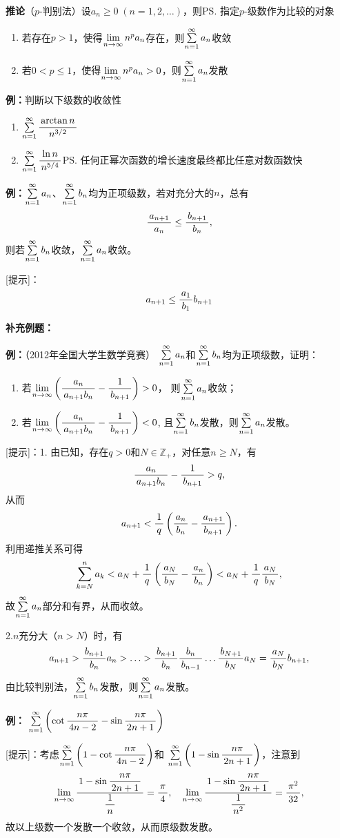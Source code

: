 {\bf 推论}（$p$-判别法）设$a_n\geq 0\;(n=1,2,\ldots)$，则\ps{指定$p$-级数作为比较的对象} 
\begin{enumerate}
  \setlength{\itemindent}{1cm}
  \item 若存在$p>1$，使得$\limn n^pa_n$存在，则$\sumn a_n$收敛 
  \item 若$0<p\leq 1$，使得$\limn n^pa_n>0$，则$\sumn a_n$发散
\end{enumerate}

{\bf 例：}判断以下级数的收敛性
\begin{enumerate}[(1)]
  \setlength{\itemindent}{1cm}
  \item $\sumn\df{\arctan n}{n^{3/2}}$
  \item $\sumn\df{\ln n}{n^{5/4}}$\ps{任何正幂次函数的增长速度最终都比任意对数函数快}
\end{enumerate}

{\bf 例：}$\sumn a_n$、$\sumn b_n$均为正项级数，若对充分大的$n$，总有
$$\df{a_{n+1}}{a_n}\leq\df{b_{n+1}}{b_n},$$
则若$\sumn b_n$收敛，$\sumn a_n$收敛。

[提示]：
$$a_{n+1}\leq\df{a_1}{b_1}b_{n+1}$$

{\bf 补充例题：}

{\bf 例：}（2012年全国大学生数学竞赛）
$\sumn a_n$和$\sumn b_n$均为正项级数，证明：
\begin{enumerate}
  \setlength{\itemindent}{1cm}
  \item 若$\limn\left(\df{a_n}{a_{n+1}b_n}-\df 1{b_{n+1}}\right)>0$，
  则$\sumn a_n$收敛；
  \item 若$\limn\left(\df{a_n}{a_{n+1}b_n}-\df 1{b_{n+1}}\right)<0$,
  且$\sumn b_n$发散，则$\sumn a_n$发散。
\end{enumerate}

[提示]：1. 由已知，存在$q>0$和$N\in\mathbb{Z}_+$，对任意$n\geq N$，有
$$\df{a_n}{a_{n+1}b_n}-\df 1{b_{n+1}}>q,$$
从而
$$a_{n+1}<\df1q\left(\df{a_n}{b_n}-\df{a_{n+1}}{b_{n+1}}\right).$$
利用递推关系可得
$$\sum\limits_{k=N}^na_k<a_N+\df1q\left(\df{a_N}{b_N}-\df{a_n}{b_n}\right)
<a_N+\df1q\df{a_N}{b_N},$$
故$\sumn a_n$部分和有界，从而收敛。

2.$n$充分大（$n>N$）时，有
$$a_{n+1}>\df{b_{n+1}}{b_n}a_n>\ldots>
\df{b_{n+1}}{b_n}\df{b_{n}}{b_{n-1}}\ldots\df{b_{N+1}}{b_N}a_N
=\df{a_N}{b_N}b_{n+1},$$
由比较判别法，$\sumn b_n$发散，则$\sumn a_n$发散。

{\bf 例：} $\sumn\left(\cot\df{n\pi}{4n-2}-\sin\df{n\pi}{2n+1}\right)$

[提示]：考虑$\sumn\left(1-\cot\df{n\pi}{4n-2}\right)$和
$\sumn\left(1-\sin\df{n\pi}{2n+1}\right)$，注意到
$$\limn\df{1-\sin\df{n\pi}{2n+1}}{\df1n}=\df{\pi}4,
\quad\limn\df{1-\sin\df{n\pi}{2n+1}}{\df1{n^2}}=\df{\pi^2}{32},$$
故以上级数一个发散一个收敛，从而原级数发散。

